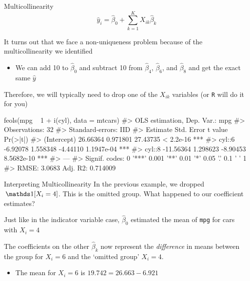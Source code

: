 \documentclass[aspectratio=169,t,11pt,table]{beamer}
\begin{document}
\begin{frame}{Multicollinearity}
  \vspace*{-\bigskipamount}
  $$
    \hat{y}_i = \hat{\beta}_0 + \sum_{k=1}^K X_{ik} \hat{\beta}_k 
  $$

  \bigskip
  It turns out that we face a non-uniqueness problem because of the \alert{multicollinearity} we identified 
  \begin{itemize}
    \item We can add 10 to $\hat{\beta}_0$ and subtract 10 from $\hat{\beta}_4$, $\hat{\beta}_6$, and $\hat{\beta}_8$ and get the exact same $\hat{y}$
  \end{itemize}

  \bigskip
  Therefore, we will typically need to drop one of the $X_{ik}$ variables (or \texttt{R} will do it for you)
\end{frame}

\begin{frame}[fragile]{}
  \begin{codeblock}
feols(mpg ~ 1 + i(cyl), data = mtcars)
#> OLS estimation, Dep. Var.: mpg
#> Observations: 32
#> Standard-errors: IID 
#>              Estimate Std. Error  t value   Pr(>|t|)    
#> (Intercept)  26.66364   0.971801 27.43735  < 2.2e-16 ***
#> cyl::6       -6.92078   1.558348 -4.44110 1.1947e-04 ***
#> cyl::8      -11.56364   1.298623 -8.90453 8.5682e-10 ***
#> ---
#> Signif. codes:  0 '***' 0.001 '**' 0.01 '*' 0.05 '.' 0.1 ' ' 1
#> RMSE: 3.0683   Adj. R2: 0.714009
  \end{codeblock}
\end{frame}

\begin{frame}{Interpreting Multicollinearity}
  In the previous example, we dropped $\one{X_i = 4}$. This is the \alert{omitted group}. What happened to our coefficient estimates?

  \bigskip
  Just like in the indicator variable case, $\hat{\beta}_0$ estimated the mean of \texttt{mpg} for cars with $X_i = 4$
  
  \pause
  \bigskip
  The coefficients on the other $\hat{\beta}_k$ now represent the \emph{difference} in means between the group for $X_i = 6$ and the `omitted group' $X_i = 4$. 
  \begin{itemize}
    \item The mean for $X_i = 6$ is $19.742 = 26.663 - 6.921$
  \end{itemize}
\end{frame}
\end{document}
